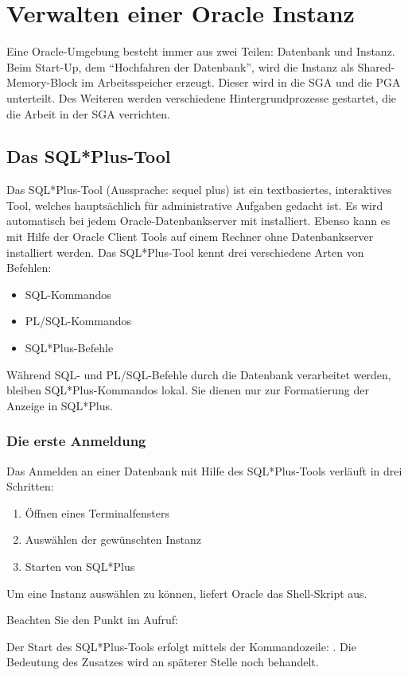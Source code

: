   \chapter{Verwalten einer Oracle Instanz}
    \setcounter{page}{1}
    \minitoc
\newpage
    Eine Oracle-Umgebung besteht immer aus zwei Teilen: Datenbank und Instanz.
    Beim Start-Up, dem \enquote{Hochfahren der Datenbank}, wird die Instanz als
    Shared-Memory-Block im Arbeitsspeicher erzeugt. Dieser wird in die SGA und
    die PGA unterteilt. Des Weiteren werden verschiedene Hintergrundprozesse
    gestartet, die die Arbeit in der SGA verrichten.
    \section{Das SQL*Plus-Tool}
      Das SQL*Plus-Tool (Aussprache: sequel plus) ist ein textbasiertes, interaktives Tool, welches haupts\"achlich f\"ur administrative Aufgaben gedacht ist. Es wird automatisch bei jedem Oracle-Datenbankserver mit installiert. Ebenso kann es mit Hilfe der Oracle Client Tools auf einem Rechner ohne Datenbankserver installiert werden.
      Das SQL*Plus-Tool kennt drei verschiedene Arten von Befehlen:
      \begin{itemize}
        \item SQL-Kommandos
        \item PL/SQL-Kommandos
        \item SQL*Plus-Befehle
      \end{itemize}
      W\"ahrend SQL- und PL/SQL-Befehle durch die Datenbank verarbeitet werden,
      bleiben SQL*Plus-Kommandos lokal. Sie dienen nur zur Formatierung der
      Anzeige in SQL*Plus.
      \subsection{Die erste Anmeldung}
        Das Anmelden an einer Datenbank mit Hilfe des SQL*Plus-Tools verl\"auft
        in drei Schritten:
        \begin{enumerate}
          \item \"Offnen eines Terminalfensters
          \item Ausw\"ahlen der gew\"unschten Instanz
          \item Starten von SQL*Plus
        \end{enumerate}
        Um eine Instanz ausw\"ahlen zu k\"onnen, liefert Oracle das Shell-Skript
         aus.
        \begin{merke}
          Beachten Sie den Punkt im Aufruf: 
        \end{merke}
        Der Start des SQL*Plus-Tools erfolgt mittels der Kommandozeile: . Die Bedeutung des Zusatzes  wird an sp\"aterer Stelle noch behandelt.
